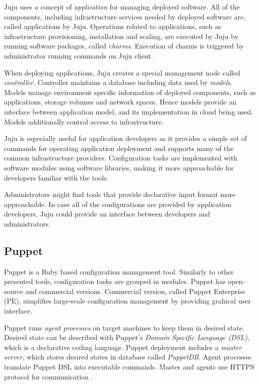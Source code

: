 Juju uses a concept of \textit{application} for managing deployed software. All
of the components, including infrastructure services needed by deployed
software are, called applications by Juju. Operations related to applications,
such as infrastructure provisioning, installation and scaling, are executed by
Juju by running software packages, called \textit{charms}. Execution of charms
is triggered by administrator running commands on Juju client.

When deploying applications, Juju creates a special management node called
\textit{controller}. Controller maintains a database including data used by
\textit{models}. Models manage environment specific information of deployed
components, such as applications, storage volumes and network spaces. Hence
models provide an interface between application model, and its implementation
in cloud being used. Models additionally control access to infrastructure.

Juju is especially useful for application developers as it provides a simple
set of commands for operating application deployment and supports many of the
common infrastructure providers. Configuration tasks are implemented with
software modules using software libraries, making it more approachable for
developers familiar with the tools.

Administrators might find tools that provide declarative input format more
approachable. In case all of the configurations are provided by application
developers, Juju could provide an interface between developers and
administrators.

\subsection{Puppet}

Puppet \cite{puppet} is a Ruby based configuration management tool. Similarly
to other presented tools, configuration tasks are grouped in modules. Puppet
has open-source and commercial versions. Commercial version, called Puppet
Enterprise (PE), simplifies large-scale configuration management by providing
grahical user interface.

Puppet runs \textit{agent processes} on target machines to keep them in desired
state. Desired state can be described with Puppet's \textit{Domain Specific
Language (DSL)}, which is a declarative coding language. Puppet deployment
includes a \textit{master server}, which stores desired states in database
called \textit{PuppetDB}. Agent processes translate Puppet DSL into executable
commands. Master and agents use HTTPS protocol for communication \cite{puppet}.

